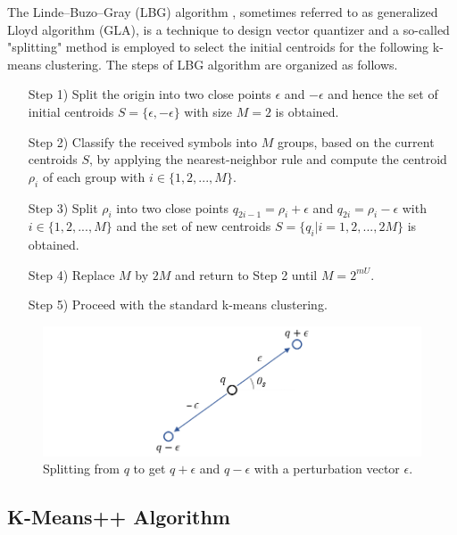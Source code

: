 The Linde–Buzo–Gray (LBG) algorithm \cite{lbg80}, sometimes referred to as generalized Lloyd algorithm (GLA), is a technique to design vector quantizer and a so-called "splitting" method is employed to select the initial centroids for the following k-means clustering. The steps of LBG algorithm are organized as follows.
\begin{enumerate}[leftmargin=\leftmargin+\widthof{Prefix}]
\item[Step 1)] Split the origin into two close points $\epsilon$ and $-\epsilon$ and hence the set of initial centroids $S=\{\epsilon,-\epsilon\}$ with size $M=2$ is obtained.
\item[Step 2)] Classify the received symbols into $M$ groups, based on the current centroids $S$, by applying the nearest-neighbor rule and compute the centroid $\rho_i$ of each group with $i \in \{1, 2, ..., M\}$.
\item[Step 3)] Split $\rho_i$ into two close points $q_{2i-1}=\rho_i+\epsilon$ and $q_{2i}=\rho_i-\epsilon$ with $i \in \{1, 2, ..., M\}$ and the set of new centroids $S=\{q_i| i=1, 2, ...,2M\}$ is obtained.
\item[Step 4)] Replace $M$ by $2M$ and return to Step 2 until $M=2^{mU}$.
\item[Step 5)] Proceed with the standard k-means clustering.
\end{enumerate}

\begin{figure}[t!]
 \centering
 \includegraphics[width=15cm]{fig/lbg_splitting.png}
 \caption{Splitting from $q$ to get $q+\epsilon$ and $q-\epsilon$ with a perturbation vector $\epsilon$.}
 \label{fig:lbg_splitting}
\end{figure}


\subsection{K-Means++ Algorithm}


